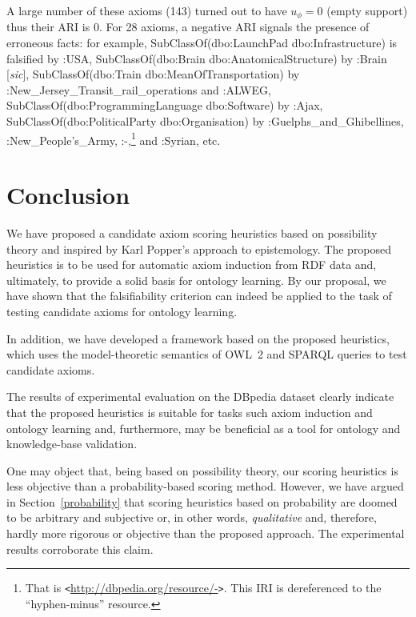 \documentclass{llncs}
\begin{document}
A large number of these axioms (143) turned out to have $u_\phi = 0$ (empty support)
thus their ARI is 0. For 28 axioms, a negative ARI signals the presence of
erroneous facts: for example,
\textsf{SubClassOf(dbo:LaunchPad dbo:Infrastructure)} is falsified by \textsf{:USA},
\textsf{SubClassOf(dbo:Brain dbo:AnatomicalStructure)} by \textsf{:Brain} [\emph{sic}],
\textsf{SubClassOf(dbo:Train dbo:MeanOfTransportation)} by
  \textsf{:New\_Jersey\_Transit\_rail\_op\-er\-ations} and \textsf{:ALWEG},
\textsf{SubClassOf(dbo:ProgrammingLanguage dbo:Software)} by \textsf{:Ajax},
\textsf{SubClassOf(dbo:PoliticalParty dbo:Organisation)} by
  \textsf{:Guelphs\_and\_Ghibellines}, \textsf{:New\_People's\_Army},
  \textsf{:-},\footnote{That is \texttt{<}\url{http://dbpedia.org/resource/-}\texttt{>}.
  This IRI is dereferenced to the ``hyphen-minus'' resource.} and \textsf{:Syrian}, etc.

\section{Conclusion}
\label{conclusion}

We have proposed a candidate axiom scoring heuristics based on possibility theory
and inspired by Karl Popper's approach to epistemology.
The proposed heuristics is to be used for automatic axiom induction from RDF data
and, ultimately, to provide a solid basis for ontology learning.
By our proposal, we have shown that the falsifiability criterion can indeed be applied
to the task of testing candidate axioms for ontology learning.

In addition, we have developed a framework based on the proposed heuristics,
which uses the model-theoretic semantics of OWL~2 and SPARQL queries to test
candidate axioms.

The results of experimental evaluation on the DBpedia dataset clearly indicate
that the proposed heuristics is suitable for tasks such axiom
induction and ontology learning and, furthermore, may be beneficial as a tool
for ontology and knowledge-base validation.

One may object that, being based on possibility theory, our scoring heuristics
is less objective than a probability-based scoring method. However, we have argued
in Section~\ref{probability} that scoring heuristics based on probability are doomed
to be arbitrary and subjective or, in other words, \emph{qualitative}
and, therefore, hardly more rigorous or objective than the proposed approach.
The experimental results corroborate this claim.
\end{document}
